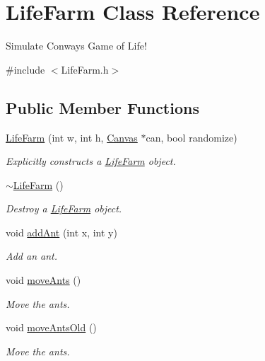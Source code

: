\hypertarget{class_life_farm}{}\section{Life\+Farm Class Reference}
\label{class_life_farm}


Simulate Conway\textquotesingle{}s Game of Life!  




{\ttfamily \#include $<$Life\+Farm.\+h$>$}

\subsection*{Public Member Functions}
\begin{DoxyCompactItemize}
\item 
\hyperlink{class_life_farm_a3efbe8593fe83e366118f3fd6c5c2602}{Life\+Farm} (int w, int h, \hyperlink{classtsgl_1_1_canvas}{Canvas} $\ast$can, bool randomize)
\begin{DoxyCompactList}\small\item\em Explicitly constructs a \hyperlink{class_life_farm}{Life\+Farm} object. \end{DoxyCompactList}\item 
\hyperlink{class_life_farm_a364e73979cc9f09718273a65ab95fda1}{$\sim$\+Life\+Farm} ()
\begin{DoxyCompactList}\small\item\em Destroy a \hyperlink{class_life_farm}{Life\+Farm} object. \end{DoxyCompactList}\item 
void \hyperlink{class_life_farm_ac7ca1a0ae94a971bd04a699f99965b00}{add\+Ant} (int x, int y)
\begin{DoxyCompactList}\small\item\em Add an ant. \end{DoxyCompactList}\item 
void \hyperlink{class_life_farm_a3a7fdaa21bdc3d302960b3ea83be95df}{move\+Ants} ()
\begin{DoxyCompactList}\small\item\em Move the ants. \end{DoxyCompactList}\item 
void \hyperlink{class_life_farm_a4dce4424b7820fd64d7ec489a9606f87}{move\+Ants\+Old} ()
\begin{DoxyCompactList}\small\item\em Move the ants. \end{DoxyCompactList}\item 

\end{DoxyCompactItemize}
